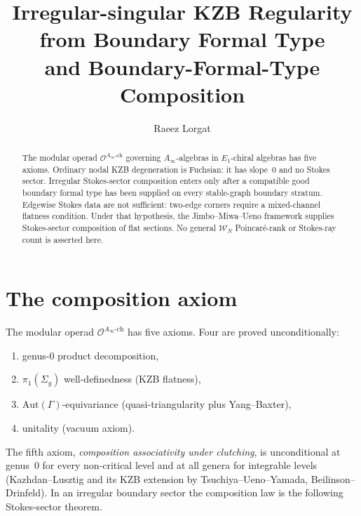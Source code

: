 \documentclass[11pt]{amsart}
\title{Irregular-singular KZB Regularity from Boundary Formal Type\\
and Boundary-Formal-Type Composition}
\author{Raeez Lorgat}
\theoremstyle{definition}
\theoremstyle{remark}
\providecommand{\Ainf}{A_\infty}
\begin{document}
\maketitle

\begin{abstract}
The modular operad $\mathcal{O}^{\Ainf\text{-ch}}$ governing
$\Ainf$-algebras in $E_1$-chiral algebras has five axioms. Ordinary
nodal KZB degeneration is Fuchsian: it has slope~$0$ and no Stokes
sector.  Irregular Stokes-sector composition enters only after a
compatible good boundary formal type has been supplied on every
stable-graph boundary stratum.  Edgewise Stokes data are not
sufficient: two-edge corners require a mixed-channel flatness
condition.  Under that hypothesis, the Jimbo--Miwa--Ueno framework
supplies Stokes-sector composition of flat sections.  No general
$\mathcal{W}_N$ Poincar\'e-rank or Stokes-ray count is asserted here.
\end{abstract}

\section{The composition axiom}

The modular operad $\mathcal{O}^{\Ainf\text{-ch}}$ has five axioms.
Four are proved unconditionally:
\begin{enumerate}[label=(\roman*)]
\item genus-$0$ product decomposition,
\item $\pi_1(\Sigma_g)$ well-definedness (KZB flatness),
\item $\mathrm{Aut}(\Gamma)$-equivariance (quasi-triangularity plus
Yang--Baxter),
\item unitality (vacuum axiom).
\end{enumerate}
The fifth axiom, \emph{composition associativity under clutching}, is
unconditional at genus~$0$ for every non-critical level and at all
genera for integrable levels (Kazhdan--Lusztig and its KZB extension
by Tsuchiya--Ueno--Yamada, Beilinson--Drinfeld). In an irregular
boundary sector the composition law is the following Stokes-sector
theorem.
\end{document}
